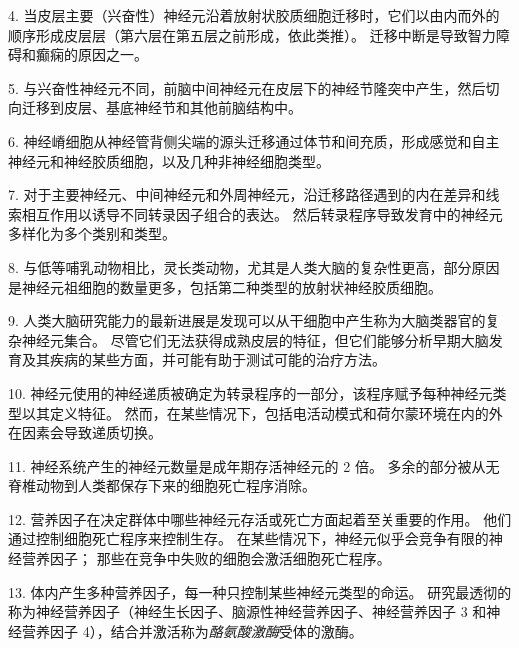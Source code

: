 4. 当皮层主要（兴奋性）神经元沿着放射状胶质细胞迁移时，它们以由内而外的顺序形成皮层层（第六层在第五层之前形成，依此类推）。
迁移中断是导致智力障碍和癫痫的原因之一。


5. 与兴奋性神经元不同，前脑中间神经元在皮层下的神经节隆突中产生，然后切向迁移到皮层、基底神经节和其他前脑结构中。


6. 神经嵴细胞从神经管背侧尖端的源头迁移通过体节和间充质，形成感觉和自主神经元和神经胶质细胞，以及几种非神经细胞类型。


7. 对于主要神经元、中间神经元和外周神经元，沿迁移路径遇到的内在差异和线索相互作用以诱导不同转录因子组合的表达。
然后转录程序导致发育中的神经元多样化为多个类别和类型。


8. 与低等哺乳动物相比，灵长类动物，尤其是人类大脑的复杂性更高，部分原因是神经元祖细胞的数量更多，包括第二种类型的放射状神经胶质细胞。


9. 人类大脑研究能力的最新进展是发现可以从干细胞中产生称为大脑类器官的复杂神经元集合。
尽管它们无法获得成熟皮层的特征，但它们能够分析早期大脑发育及其疾病的某些方面，并可能有助于测试可能的治疗方法。


10. 神经元使用的神经递质被确定为转录程序的一部分，该程序赋予每种神经元类型以其定义特征。
然而，在某些情况下，包括电活动模式和荷尔蒙环境在内的外在因素会导致递质切换。


11. 神经系统产生的神经元数量是成年期存活神经元的 2 倍。
多余的部分被从无脊椎动物到人类都保存下来的细胞死亡程序消除。


12. 营养因子在决定群体中哪些神经元存活或死亡方面起着至关重要的作用。
他们通过控制细胞死亡程序来控制生存。
在某些情况下，神经元似乎会竞争有限的神经营养因子；
那些在竞争中失败的细胞会激活细胞死亡程序。 


13. 体内产生多种营养因子，每一种只控制某些神经元类型的命运。
研究最透彻的称为神经营养因子（神经生长因子、脑源性神经营养因子、神经营养因子 3 和神经营养因子 4），结合并激活称为\textit{酪氨酸激酶}受体的激酶。


